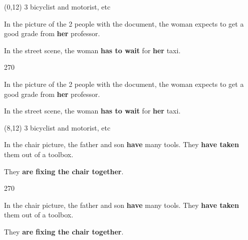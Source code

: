 \documentclass[a4paper]{article}
\newenvironment{itemize*}%
{\begin{itemize}%
 \setlength{\itemsep}{0.0cm}%
 \setlength{\parsep}{0pt}%
 \setlength{\parskip}{0pt}}%
{\end{itemize}}
\newcommand{\mycard}[3]{%
	\small #1 #2
	\par
	\parbox[t][6.8cm][c]{9.5cm}{%
	\par
	\myleft{#3}
	\par
	\myright{#3}
	}
}
\newcommand{\myleft}[1]{%
	\begin{sideways}
	\hspace*{-0.9cm}
		\parbox[t][2.7cm][t]{6.5cm}{%
		\large #1
		}
	\end{sideways}
}
\newcommand{\myright}[1]{%
	\hspace*{6.5cm}
	\begin{turn}{270}
	\hspace*{-7.1cm}
		\parbox[t][2.7cm][t]{6.5cm}{%
		\large #1
		}
	\end{turn}
}
\begin{document}
\begin{textblock}{8}(0,12)
\mycard{3}{bicyclist and motorist, etc}{
\begin{itemize*}
\item In the picture of the 2 people with the document, the woman expects to get a good grade from \textbf{her} professor.
\item In the street scene, the woman \textbf{has to wait} for \textbf{her} taxi.
\end{itemize*}
}
\end{textblock}

\begin{textblock}{8}(8,12)
\mycard{3}{bicyclist and motorist, etc}{
\normalsize
\begin{itemize*}
\item In the chair picture, the father and son \textbf{have} many tools. They \textbf{have taken} them out of a toolbox.
\item They \textbf{are fixing the chair together}.
\end{itemize*}
}
\end{textblock}

\null
\newpage
\end{document}
